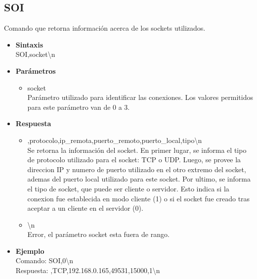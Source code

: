 \documentclass[a4paper,spanish]{article}
\begin{document}
\subsection{SOI}
Comando que retorna información acerca de los sockets utilizados.
\begin{itemize}
	\item \textbf{Sintaxis}\\
	{\ttfamily SOI,socket\textbackslash n}
	\item \textbf{Parámetros}
	\begin{itemize}
		\item{\ttfamily socket}\\
		Parámetro utilizado para identificar las conexiones. Los valores permitidos para este parámetro van de 0 a 3.
	\end{itemize}
	\item \textbf{Respuesta}
	\begin{itemize}
		\item{,protocolo,ip\_remota,puerto\_remoto,puerto\_local,tipo\textbackslash n} \\
		Se retorna la información del socket. En primer lugar, se informa el tipo de protocolo utilizado para el socket: TCP o UDP. Luego, se provee la direccion IP y numero de puerto utilizado en el otro extremo del socket, ademas del puerto local utilizado para este socket.
		Por ultimo, se informa el tipo de socket, que puede ser cliente o servidor. Esto indica si la conexion fue establecida en modo cliente (1) o si el socket fue creado tras aceptar a un cliente en el servidor (0).
		\item{\textbackslash n} \\
		Error, el parámetro {\ttfamily socket} esta fuera de rango.
	\end{itemize} 
	\item \textbf{Ejemplo}\\
	Comando: {\ttfamily SOI,0\textbackslash n}\\
	Respuesta: {,TCP,192.168.0.165,49531,15000,1\textbackslash n}
\end{itemize}
\end{document}
